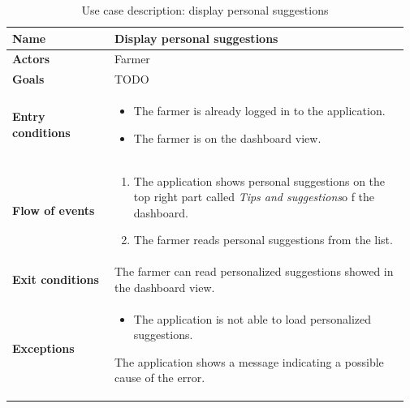 \begin{table}[H]
    \centering
	\begin{tabular}{@{}p{0.25\linewidth} p{0.72\linewidth}@{}}
\toprule
		\textbf{Name}               & Display personal suggestions\\
		\midrule
		\textbf{Actors}             & Farmer\\
		\midrule
		\textbf{Goals}              & TODO \\
		\midrule
		
		\textbf{Entry conditions}   & \begin{itemize}[leftmargin=.4cm,noitemsep,topsep=0pt,before=\vspace{-3mm},after=\vspace{-4mm}]
		    \item The farmer is already logged in to the application.
		    \item The farmer is on the dashboard view.
		\end{itemize}\\
		\midrule
		
		\textbf{Flow of events}     & \begin{enumerate}[leftmargin=.4cm,noitemsep,topsep=0pt,before=\vspace{-3mm},after=\vspace{-4mm}]
		    \item The application shows personal suggestions on the top right part called \textit{Tips and suggestions}o f the dashboard.
		    \item The farmer reads personal suggestions from the list.
		\end{enumerate}\\
		\midrule
		\textbf{Exit conditions}    & The farmer can read personalized suggestions showed in the dashboard view. \\
		\midrule
		
		\textbf{Exceptions}         & 
	    \begin{itemize}[leftmargin=.4cm,noitemsep,topsep=0pt,before=\vspace{-3mm}]
		   \item The application is not able to load personalized suggestions.
		\end{itemize}
		The application shows a message indicating a possible cause of the error.
		\\\bottomrule
	\end{tabular}
	\caption{Use case description: display personal suggestions} 
\end{table}


